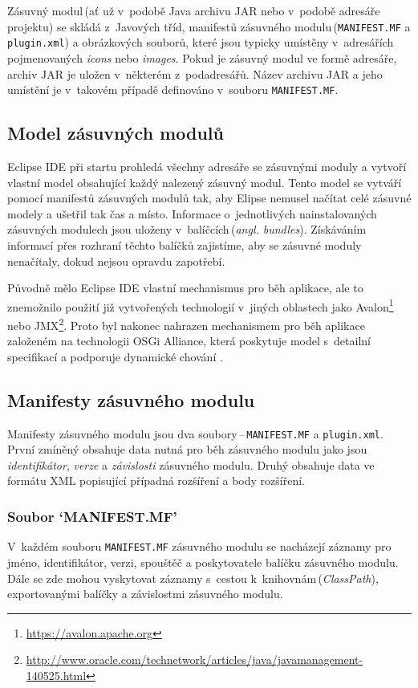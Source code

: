   Zásuvný modul\,(ať už v~podobě Java archivu JAR nebo v~podobě adresáře projektu) se skládá z~Javových tříd, manifestů zásuvného modulu\,(\texttt{MANIFEST.MF} a \texttt{plugin.xml}) a obrázkových souborů, které jsou typicky umístěny v~adresářích pojmenovaných \emph{icons} nebo \emph{images}. Pokud je zásuvný modul ve formě adresáře, archiv JAR je uložen v~některém z~podadresářů. Název archivu JAR a jeho umístění je v~takovém případě definováno v~souboru \texttt{MANIFEST.MF}.

    \subsection{Model zásuvných modulů}
    Eclipse IDE při startu prohledá všechny adresáře se zásuvnými moduly a vytvoří vlastní model obsahující každý nalezený zásuvný modul. Tento model se vytváří pomocí manifestů zásuvných modulů tak, aby Elipse nemusel načítat celé zásuvné modely a ušetřil tak čas a místo. Informace o~jednotlivých nainstalovaných zásuvných modulech jsou uloženy v~balíčcích\,(\emph{angl. bundles}). Získáváním informací přes rozhraní těchto balíčků zajistíme, aby se zásuvné moduly nenačítaly, dokud nejsou opravdu zapotřebí.

    Původně mělo Eclipse IDE vlastní mechanismus pro běh aplikace, ale to znemožnilo použití již vytvořených technologií v~jiných oblastech jako Avalon\footnote{\url{https://avalon.apache.org}} nebo JMX\footnote{\url{http://www.oracle.com/technetwork/articles/java/javamanagement-140525.html}}. Proto byl nakonec nahrazen mechanismem pro běh aplikace založeném na technologii OSGi Alliance, která poskytuje model s~detailní specifikací a podporuje dynamické chování \cite{Plugins}.

    \subsection{Manifesty zásuvného modulu}
    Manifesty zásuvného modulu jsou dva soubory\,--\,\texttt{MANIFEST.MF} a \texttt{plugin.xml}. První zmíněný obsahuje data nutná pro běh zásuvného modulu jako jsou \emph{identifikátor}, \emph{verze} a \emph{závislosti} zásuvného modulu. Druhý obsahuje data ve formátu XML popisující případná rozšíření a body rozšíření.

      \subsubsection{Soubor `MANIFEST.MF'}
      V~každém souboru \texttt{MANIFEST.MF} zásuvného modulu se nacházejí záznamy pro jméno, identifikátor, verzi, spouštěč a poskytovatele balíčku zásuvného modulu. Dále se zde mohou vyskytovat záznamy s~cestou k~knihovnám\,(\emph{ClassPath}), exportovanými balíčky a závislostmi zásuvného modulu.


